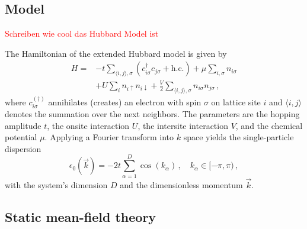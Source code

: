 \documentclass[
    reprint, 
    aps,
    preprintnumbers,
    twocolumn,
    prb,
    superscriptaddress
]{revtex4-2}
\newcommand{\vk}{\vec{k}}
\begin{document}
\subsection{Model}

\textcolor{red}{Schreiben wie cool das Hubbard Model ist}

The Hamiltonian of the extended Hubbard model is given by
\begin{equation}
    \label{eqn:full_hamiltonian}
    \begin{aligned}
        H = &-t \sum_{\langle i, j \rangle, \sigma} \left( c_{i\sigma}^\dagger c_{j\sigma} + \text{h.c.} \right) 
        + \mu \sum_{i,\sigma} n_{i\sigma} \\
        &+ U \sum_{i} n_{i\uparrow} n_{i\downarrow} 
        + \frac{V}{2} \sum_{\langle i, j\rangle, \sigma} n_{i\sigma} n_{j\sigma}\,,
    \end{aligned}
\end{equation}
where $c_{i\sigma}^{(\dagger)}$ annihilates (creates) an electron with spin $\sigma$ on lattice site $i$ 
and $\langle i, j\rangle$ denotes the summation over the next neighbors.
The parameters are the hopping amplitude $t$, the onsite interaction $U$, the intersite interaction $V$, and the chemical potential $\mu$.
Applying a Fourier transform into $k$ space yields the single-particle dispersion 
\begin{equation}
    \epsilon_0 (\vk) = -2t \sum_{\alpha=1}^D \cos(k_\alpha)\,,\quad k_\alpha \in [-\pi, \pi)\,,
\end{equation}
with the system's dimension $D$ and the dimensionless momentum $\vk$.

\subsection{Static mean-field theory}
\end{document}
